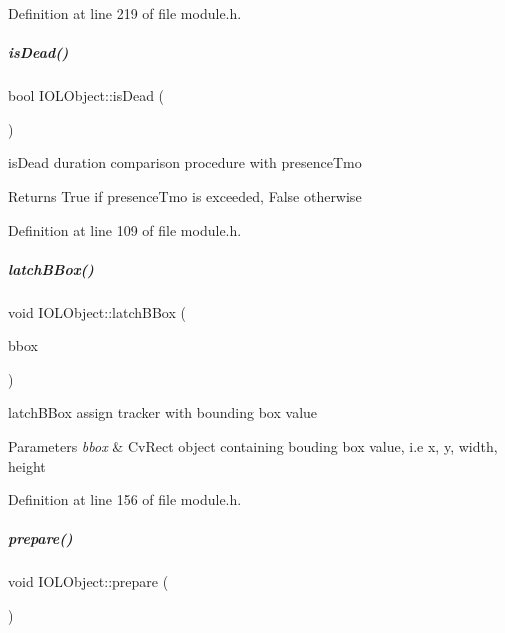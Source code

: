 Definition at line 219 of file module.\+h.

\mbox{\label{group__iol2opc_a60d0fd467e4f4ab3b4aebed4100e5f21}} 
\subparagraph{\texorpdfstring{is\+Dead()}{isDead()}}
{\footnotesize\ttfamily bool I\+O\+L\+Object\+::is\+Dead (\begin{DoxyParamCaption}{ }\end{DoxyParamCaption})\hspace{0.3cm}{\ttfamily [inline]}}



is\+Dead duration comparison procedure with presence\+Tmo 

\begin{DoxyReturn}{Returns}
True if presence\+Tmo is exceeded, False otherwise 
\end{DoxyReturn}


Definition at line 109 of file module.\+h.

\mbox{\label{group__iol2opc_a9d0702dd5fdcd2a98a5463ddae96c35a}} 
\subparagraph{\texorpdfstring{latch\+B\+Box()}{latchBBox()}}
{\footnotesize\ttfamily void I\+O\+L\+Object\+::latch\+B\+Box (\begin{DoxyParamCaption}\item[{const Cv\+Rect \&}]{bbox }\end{DoxyParamCaption})\hspace{0.3cm}{\ttfamily [inline]}}



latch\+B\+Box assign tracker with bounding box value 


\begin{DoxyParams}{Parameters}
{\em bbox} & Cv\+Rect object containing bouding box value, i.\+e x, y, width, height \\
\hline
\end{DoxyParams}


Definition at line 156 of file module.\+h.

\mbox{\label{group__iol2opc_a6122efa684bdf4ff7b8bd53ec5db93c9}} 
\subparagraph{\texorpdfstring{prepare()}{prepare()}}
{\footnotesize\ttfamily void I\+O\+L\+Object\+::prepare (\begin{DoxyParamCaption}{ }\end{DoxyParamCaption})\hspace{0.3cm}{\ttfamily [inline]}}



